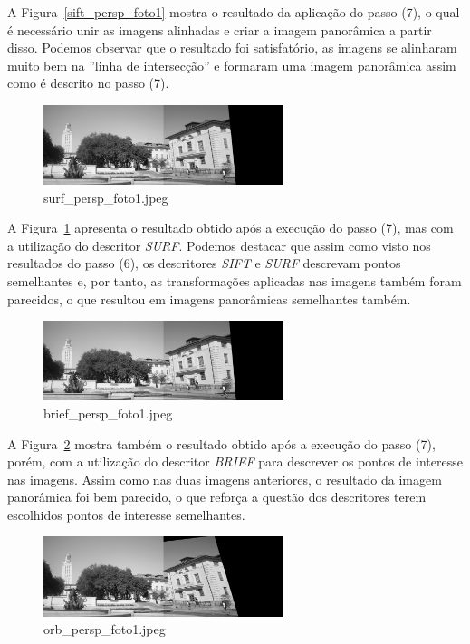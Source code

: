 \documentclass[twoside,twocolumn]{article}
\begin{document}
A Figura~\ref{sift_persp_foto1} mostra o resultado da aplicação do passo (7), o qual é necessário unir as imagens alinhadas e criar a imagem panorâmica a partir disso. Podemos observar que o resultado foi satisfatório, as imagens se alinharam muito bem na ''linha de intersecção'' e formaram uma imagem panorâmica assim como é descrito no passo (7). 

\begin{figure}[H]
\begin{center}
	\includegraphics[width=7cm]{figures/surf_persp_foto1.jpeg}
\caption{surf\_persp\_foto1.jpeg} \label{surf_persp_foto1}
\end{center}
\end{figure}

A Figura~\ref{surf_persp_foto1} apresenta o resultado obtido após a execução do passo (7), mas com a utilização do descritor \textit{SURF}. Podemos destacar que assim como visto nos resultados do passo (6), os descritores \textit{SIFT} e \textit{SURF} descrevam pontos semelhantes e, por tanto, as transformações aplicadas nas imagens também foram parecidos, o que resultou em imagens panorâmicas semelhantes também.

\begin{figure}[H]
\begin{center}
	\includegraphics[width=7cm]{figures/brief_persp_foto1.jpeg}
\caption{brief\_persp\_foto1.jpeg} \label{brief_persp_foto1}
\end{center}
\end{figure}

A Figura~\ref{brief_persp_foto1} mostra também o resultado obtido após a execução do passo (7), porém, com a utilização do descritor \textit{BRIEF} para descrever os pontos de interesse nas imagens. Assim como nas duas imagens anteriores, o resultado da imagem panorâmica foi bem parecido, o que reforça a questão dos descritores terem escolhidos pontos de interesse semelhantes.

\begin{figure}[H]
\begin{center}
	\includegraphics[width=7cm]{figures/orb_persp_foto1.jpeg}
\caption{orb\_persp\_foto1.jpeg} \label{orb_persp_foto1}
\end{center}
\end{figure}
\end{document}
